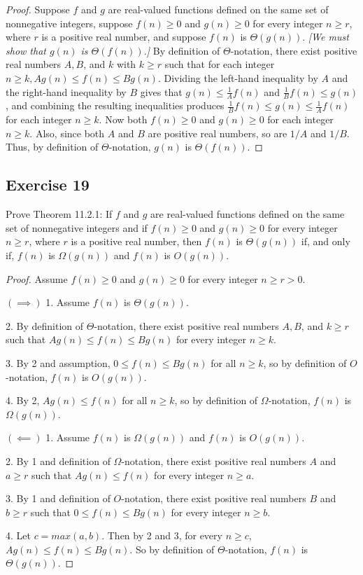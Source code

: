 \documentclass[14pt]{extarticle}
\begin{document}
\begin{proof}
Suppose \(f\) and \(g\) are real-valued functions defined on the same set of nonnegative integers, suppose \(f(n) \geq 0\) 
and \(g(n) \geq 0\) for every integer \(n \geq r\), where \(r\) is a positive real number, and suppose \(f(n)\) is 
\(\Theta(g(n))\). {\it [We must show that \(g(n)\) is \(\Theta(f(n))\).]} By definition of \(\Theta\)-notation, there
exist positive real numbers \(A, B\), and \(k\) with \(k \geq r\) such that for each integer \(n \geq k, Ag(n) \leq f(n) 
\leq Bg(n)\). Dividing the left-hand inequality by \(A\) and the right-hand inequality by \(B\) gives that \(g(n) \leq 
\frac{1}{A}f(n)\) and \(\frac{1}{B}f(n) \leq g(n)\), and combining the resulting inequalities produces \(\frac{1}{B}
f(n) \leq g(n) \leq \frac{1}{A}f(n)\) for each integer \(n \geq k\). Now both \(f(n) \geq 0\) and \(g(n) \geq 0\) for 
each integer \(n \geq k\). Also, since both \(A\) and \(B\) are positive real numbers, so are \(1/A\) and \(1/B\). Thus, 
by definition of \(\Theta\)-notation, \(g(n)\) is \(\Theta (f(n))\).
\end{proof}

\subsection{Exercise 19}
Prove Theorem 11.2.1: If \(f\) and \(g\) are real-valued functions defined on the same set of nonnegative integers and 
if \(f(n) \geq 0\) and \(g(n) \geq 0\) for every integer \(n \geq r\), where \(r\) is a positive real number, then \(f(n)\) 
is \(\Theta(g(n))\) if, and only if, \(f(n)\) is \(\Omega(g(n))\) and \(f(n)\) is \(O(g(n))\).

\begin{proof}
Assume \(f(n) \geq 0\) and \(g(n) \geq 0\) for every integer \(n \geq r > 0\).

\(\bm{(\implies)}\) 1. Assume \(f(n)\) is \(\Theta(g(n))\).

2. By definition of \(\Theta\)-notation, there exist positive real numbers \(A, B\), and \(k \geq r\) such that \(A g(n) 
\leq f(n) \leq B g(n)\) for every integer \(n \geq k\).

3. By 2 and assumption, \(0 \leq f(n) \leq Bg(n)\) for all \(n \geq k\), so by definition of \(O\)-notation, \(f(n)\) is 
\(O(g(n))\).

4. By 2, \(Ag(n) \leq f(n)\) for all \(n \geq k\), so by definition of \(\Omega\)-notation, \(f(n)\) is \(\Omega(g(n))\).

\(\bm{(\impliedby)}\) 1. Assume \(f(n)\) is \(\Omega(g(n))\) and \(f(n)\) is \(O(g(n))\).

2. By 1 and definition of \(\Omega\)-notation, there exist positive real numbers \(A\) and \(a \geq r\) such that 
\(Ag(n) \leq f(n)\) for every integer \(n \geq a\).

3. By 1 and definition of \(O\)-notation, there exist positive real numbers \(B\) and \(b \geq r\) such that 
\(0 \leq f(n) \leq Bg(n)\) for every integer \(n \geq b\).

4. Let \(c = max(a,b)\). Then by 2 and 3, for every \(n \geq c\), \(Ag(n) \leq f(n) \leq Bg(n)\). So by definition of 
\(\Theta\)-notation, \(f(n)\) is \(\Theta(g(n))\).
\end{proof}
\end{document}
